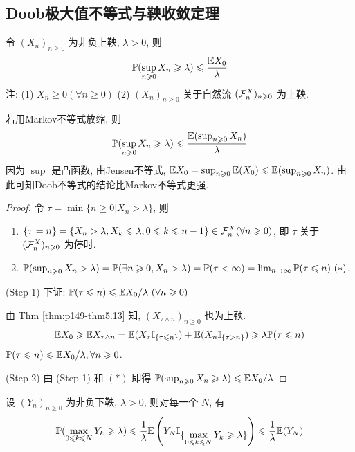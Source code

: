 \subsection{Doob极大值不等式与鞅收敛定理}

\begin{theorem}[Doob极大值不等式]
    令 $(X_n)_{n\geq 0}$ 为非负上鞅, $\lambda>0$, 则
    \[
    \mathbb{P}(\sup_{n\geqslant 0} X_n\geqslant \lambda)\leqslant \frac{\mathbb E X_0}{\lambda}
    \]
    注: (1) $X_n\geq 0 (\forall n\geq 0)$ (2) $(X_n)_{n\geq 0}$ 关于自然流 $(\mathcal{F}_n^X)_{n\geqslant 0}$ 为上鞅.
\end{theorem}

若用Markov不等式放缩, 则
\[
\mathbb{P}(\sup_{n\geqslant 0} X_n\geqslant \lambda)\leqslant \frac{\mathbb E (\sup_{n\geqslant 0} X_n)}{\lambda}
\]
因为 $\sup$ 是凸函数, 由Jensen不等式, $\mathbb E X_0=\sup_{n\geqslant 0}\mathbb E(X_0)\leqslant \mathbb E(\sup_{n\geqslant 0} X_n)$. 由此可知Doob不等式的结论比Markov不等式更强.

\begin{proof}
    令 $\tau=\min\{n\geq 0|X_n>\lambda\}$, 则
    \begin{enumerate}
        \item $\{\tau=n\}=\{X_n>\lambda, X_k\leqslant \lambda,0\leqslant k\leqslant n-1\}\in\mathcal{F}_n^X (\forall n\geqslant 0)$, 即 $\tau$ 关于 $(\mathcal{F}_n^X)_{n\geqslant 0}$ 为停时.
        \item $\PP(\sup_{n\geq 0}X_n>\lambda)=\PP(\exists n\geq 0, X_n>\lambda)=\PP(\tau<\infty)=\limit{n}\PP(\tau\leq n)\ (*)$. 
    \end{enumerate}
    (Step 1) 下证: $\mathbb{P}(\tau\leqslant n)\leqslant \mathbb E X_0/\lambda \ (\forall n\geqslant 0)$

    由 Thm \ref{thm:p149-thm5.13} 知, $(X_{\tau\land n})_{n\geq 0}$ 也为上鞅.
    \[
    \mathbb E X_0 \geqslant \mathbb E X_{\tau\land n}=\mathbb E (X_{\tau}\mathbb I_{\{\tau\leqslant n\}})+\mathbb E(X_n\mathbb I_{\{\tau>n\}})\geqslant \lambda \mathbb{P}(\tau\leqslant n)
    \]
    $\mathbb{P}(\tau\leqslant n)\leqslant \mathbb E X_0/\lambda, \forall n\geqslant 0$.

    (Step 2) 由 (Step 1) 和 $(*)$ 即得 $\mathbb{P}(\sup_{n\geqslant 0} X_n\geqslant \lambda)\leqslant \mathbb E X_0/\lambda$
\end{proof}

\begin{theorem}[下鞅的Doob极大值不等式]
    设 $(Y_n)_{n\geq 0}$ 为非负下鞅, $\lambda>0$, 则对每一个 $N$, 有
    \[
    \mathbb{P}(\max_{0\leqslant k\leqslant N}Y_k\geqslant \lambda)\leqslant \frac{1}{\lambda}\mathbb E\left(
        Y_N\mathbb I_{\displaystyle\{\max_{0\leqslant k\leqslant N}Y_k\geqslant \lambda\}}
    \right)\leqslant \frac{1}{\lambda}\mathbb E (Y_N)
    \]
\end{theorem}


